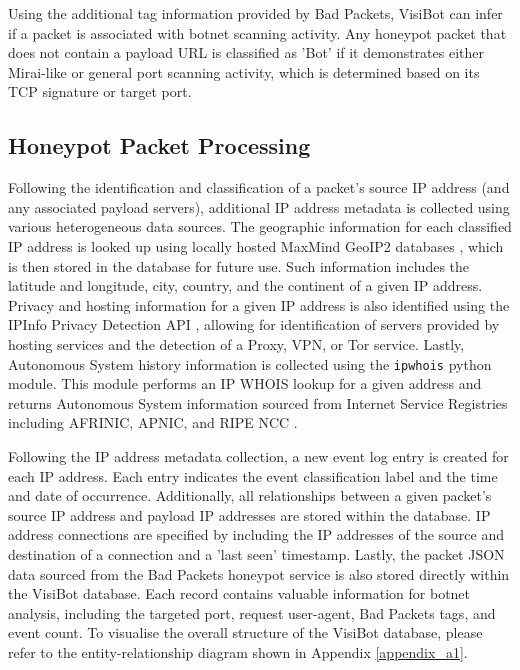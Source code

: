 Using the additional tag information provided by Bad Packets, VisiBot can infer if a packet is associated with botnet scanning activity. Any honeypot packet that does not contain a payload URL is classified as 'Bot' if it demonstrates either Mirai-like or general port scanning activity, which is determined based on its TCP signature or target port.  

\subsection{Honeypot Packet Processing}

Following the identification and classification of a packet's source IP address (and any associated payload servers), additional IP address metadata is collected using various heterogeneous data sources. The geographic information for each classified IP address is looked up using locally hosted MaxMind GeoIP2 databases \citep{MaxMind}, which is then stored in the database for future use. Such information includes the latitude and longitude, city, country, and the continent of a given IP address. Privacy and hosting information for a given IP address is also identified using the IPInfo Privacy Detection API \citep{IPInfo}, allowing for identification of servers provided by hosting services and the detection of a Proxy, VPN, or Tor service. Lastly, Autonomous System history information is collected using the \texttt{ipwhois} python module. This module performs an IP WHOIS lookup for a given address and returns Autonomous System information sourced from Internet Service Registries including AFRINIC, APNIC, and RIPE NCC \citep{Afrinic, Apnic, RipeNCC}.

Following the IP address metadata collection, a new event log entry is created for each IP address. Each entry indicates the event classification label and the time and date of occurrence. Additionally, all relationships between a given packet's source IP address and payload IP addresses are stored within the database. IP address connections are specified by including the IP addresses of the source and destination of a connection and a 'last seen' timestamp. Lastly, the packet JSON data sourced from the Bad Packets honeypot service is also stored directly within the VisiBot database. Each record contains valuable information for botnet analysis, including the targeted port, request user-agent, Bad Packets tags, and event count. To visualise the overall structure of the VisiBot database, please refer to the entity-relationship diagram shown in Appendix \ref{appendix_a1}.

